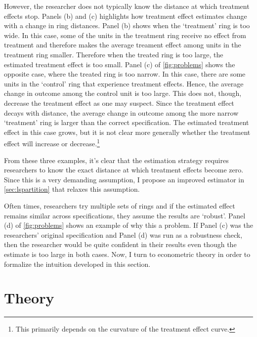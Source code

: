 \documentclass[10pt]{article}
\begin{document}
However, the researcher does not typically know the distance at which treatment effects stop. Panels (b) and (c) highlights how treatment effect estimates change with a change in ring distances. Panel (b) shows when the `treatment' ring is too wide. In this case, some of the units in the treatment ring receive no effect from treatment and therefore makes the average treament effect among units in the treatment ring smaller. Therefore when the treated ring is too large, the estimated treatment effect is too small. Panel (c) of \autoref{fig:problems} shows the opposite case, where the treated ring is too narrow. In this case, there are some units in the `control' ring that experience treatment effects. Hence, the average change in outcome among the control unit is too large. This does not, though, decrease the treatment effect as one may suspect. Since the treatment effect decays with distance, the average change in outcome among the more narrow `treatment' ring is larger than the correct specification. The estimated treatment effect in this case grows, but it is not clear more generally whether the treatment effect will increase or decrease.\footnote{This primarily depends on the curvature of the treatment effect curve.} 

From these three examples, it's clear that the estimation strategy requires researchers to know the exact distance at which treatment effects become zero. Since this is a very demanding assumption, I propose an improved estimator in \autoref{sec:lspartition} that relaxes this assumption. 

Often times, researchers try multiple sets of rings and if the estimated effect remains similar across specifications, they assume the results are `robust'. Panel (d) of \autoref{fig:problems} shows an example of why this a problem. If Panel (c) was the researchers' original specification and Panel (d) was run as a robustness check, then the researcher would be quite confident in their results even though the estimate is too large in both cases. Now, I turn to econometric theory in order to formalize the intuition developed in this section.



\section{Theory}
\end{document}

